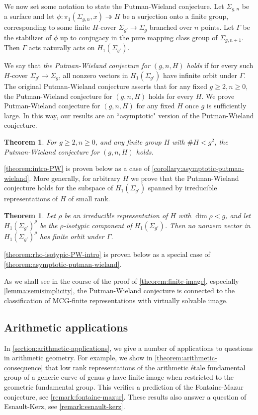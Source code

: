 \documentclass[12 pt]{amsart}
\theoremstyle{plain}
\newtheorem{theorem}[subsubsection]{Theorem}
\theoremstyle{definition}
\theoremstyle{remark}
\numberwithin{equation}{section}
\begin{document}
We now set some notation to state the Putman-Wieland conjecture.
Let $\Sigma_{g,n}$ be a surface and let $\phi: \pi_1(\Sigma_{g,n},
x)\twoheadrightarrow H$ be a surjection onto a finite group, corresponding to
some finite $H$-cover $\Sigma_{g'}\to \Sigma_{g}$ branched over $n$ points. Let $\Gamma$ be the  stabilizer of $\phi$ up to conjugacy in the pure mapping class group of $\Sigma_{g,n+1}$. Then $\Gamma$ acts naturally acts on $H_1(\Sigma_{g'})$. 

We say that {\em the Putman-Wieland conjecture for $(g,n,H)$ holds} if
for every such $H$-cover $\Sigma_{g'} \to \Sigma_g$, 
all nonzero vectors in $H_1(\Sigma_{g'})$ have infinite orbit under $\Gamma$.
The original Putman-Wieland conjecture 
\cite[Conjecture 1.2]{putmanW:abelian-quotients}
asserts that for any fixed $g \geq 2, n \geq 0$,
the Putman-Wieland conjecture for $(g,n,H)$
holds for every $H$.
We prove 
Putman-Wieland conjecture for $(g,n,H)$ for any fixed $H$ once $g$
is sufficiently large. 
In this way, our results are an ``asymptotic" version of the Putman-Wieland conjecture. 
\begin{theorem}\label{theorem:intro-PW}
	For $g \geq 2, n \geq 0$, and any finite group $H$ with
	$\#H<g^2$,
	the Putman-Wieland conjecture for $(g,n,H)$ holds.
\end{theorem}
\autoref{theorem:intro-PW} is proven below as a case of \autoref{corollary:asymptotic-putman-wieland}.
More generally, for arbitrary $H$ we prove that the Putman-Wieland conjecture holds for the subspace of $H_1(\Sigma_{g'})$ spanned by irreducible representations of $H$ of small rank.
\begin{theorem}\label{theorem:rho-isotypic-PW-intro}
	Let $\rho$ be an irreducible representation of $H$ with $\dim\rho<g$, and let $H_1(\Sigma_{g'})^{\rho}$ be the $\rho$-isotypic component of $H_1(\Sigma_{g'})$. Then no nonzero vector in $H_1(\Sigma_{g'})^{\rho}$ has finite orbit under $\Gamma$.
\end{theorem}
\autoref{theorem:rho-isotypic-PW-intro} is proven below as a special case of
\autoref{theorem:asymptotic-putman-wieland}.

As we shall see in the course of the proof of \autoref{theorem:finite-image},
especially \autoref{lemma:semisimplicity},
the Putman-Wieland conjecture is connected to the classification of MCG-finite representations with virtually solvable image.

\subsection{Arithmetic applications}
\label{subsection:arithmetic}
In \autoref{section:arithmetic-applications}, we give a number of applications
to questions in arithmetic geometry. For example, we show in
\autoref{theorem:arithmetic-consequence} that low rank representations of the
arithmetic \'etale fundamental group of a generic curve of genus $g$ have finite
image when restricted to the geometric fundamental group. This verifies a
prediction of the Fontaine-Mazur conjecture, see
\autoref{remark:fontaine-mazur}. 
These results also answer a question of Esnault-Kerz, see \autoref{remark:esnault-kerz}.
\end{document}
